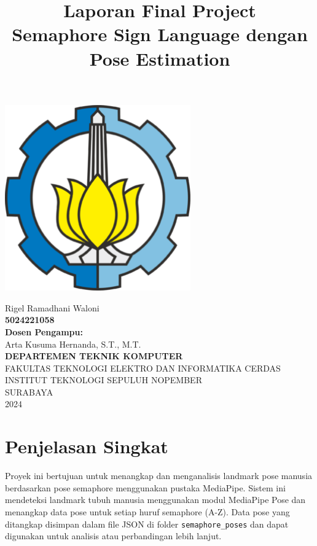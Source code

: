 \documentclass[a4paper,12pt]{article}
\title{\textbf{Laporan Final Project}\\[1em] \huge Semaphore Sign Language dengan Pose Estimation}
\date{}
\begin{document}
\maketitle

\begin{center}
    \includegraphics[width=0.6\textwidth]{logo_its.png}
    \vspace{2em}
\end{center}

\begin{center}
  Rigel Ramadhani Waloni \\
  \textbf{5024221058} \\ 
  \vspace{1.5em}
  \textbf{Dosen Pengampu:} \\ 
  Arta Kusuma Hernanda, S.T., M.T. \\ 
  \vspace{3em}
  \textbf{DEPARTEMEN TEKNIK KOMPUTER} \\ 
  FAKULTAS TEKNOLOGI ELEKTRO DAN INFORMATIKA CERDAS \\ 
  INSTITUT TEKNOLOGI SEPULUH NOPEMBER \\ 
  SURABAYA \\
  2024
\end{center}

\newpage

\section[A]{Penjelasan Singkat}
Proyek ini bertujuan untuk menangkap dan menganalisis landmark pose manusia berdasarkan pose semaphore menggunakan pustaka MediaPipe. Sistem ini mendeteksi landmark tubuh manusia menggunakan modul MediaPipe Pose dan menangkap data pose untuk setiap huruf semaphore (A-Z). Data pose yang ditangkap disimpan dalam file JSON di folder \texttt{semaphore\_poses} dan dapat digunakan untuk analisis atau perbandingan lebih lanjut.
\end{document}
